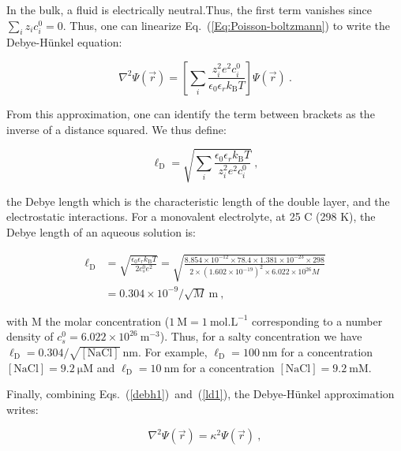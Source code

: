 In the bulk, a fluid is electrically neutral.Thus, the first term vanishes since $\sum_i z_i c_i^0 = 0$. Thus, one can linearize Eq.~(\ref{Eq:Poisson-boltzmann}) to write the Debye-Hünkel equation:

\begin{equation}
	\nabla^2 \Psi (\vec{r}) = \left[  \sum_i \frac{z_i ^2 e^2 c_i^0}{\epsilon_0 \epsilon_r  k_\mathrm{B} T}    \right] \Psi (\vec{r}) ~.
	\label{debh1}
\end{equation}

From this approximation, one can identify the term between brackets as the inverse of a distance squared. We thus define:

\begin{equation}
	\ell _\mathrm{D} =  \sqrt{ \sum_i\frac {\epsilon_0 \epsilon_r k_\mathrm{B} T} {z_i ^2 e^2 c_i^0}} ~,
	\label{ld1}
\end{equation}

the Debye length which is the characteristic length of the double layer, and the electrostatic interactions. For a monovalent electrolyte,  at 25 \textdegree C (298 K), the Debye length of an aqueous solution is:

\begin{equation}
	\begin{aligned}
		\ell _\mathrm{D} &= \sqrt{\frac{\epsilon_0 \epsilon_r k_\mathrm{B}T}{2c_s^0 e^2}}
		= \sqrt{\frac{8.854 \times 10^{-12} \times 78.4 \times 1.381 \times 10^{-23}  \times 298}{2 \times (1.602 \times 10^{-19})^2 \times 6.022 \times 10^{26} M}} \\
		& = 0.304 \times 10^{-9} / \sqrt{M} ~ \mathrm{m} ~,
	\end{aligned}
\end{equation}


with M the molar concentration ($1 ~ \mathrm{M} = 1 ~ \mathrm{mol.L^{-1}} $ corresponding to a number density of $c_s^0 = 6.022 \times 10 ^{26} ~ \mathrm{ m^{-3}}$). Thus, for a salty concentration we have
$\ell_\mathrm{D} = 0.304/ \sqrt{[\mathrm{NaCl}]} ~ \mathrm{nm}$. For example, $\ell_\mathrm{D} = 100 ~ \mathrm{nm}$ for a concentration  $[\mathrm{NaCl}] = 9.2 ~ \mathrm{\mu M}$ and   $\ell_\mathrm{D} = 10 ~  \mathrm{nm}$ for a concentration  $[\mathrm{NaCl}] = 9.2 ~ \mathrm{mM}$.



Finally, combining Eqs.~(\ref{debh1})~and~(\ref{ld1}),  the Debye-Hünkel approximation writes:

\begin{equation}
	\nabla^2 \Psi (\vec{r}) = \kappa^2  \Psi (\vec{r}) ~,
	\label{Eq:Debye_hu}
\end{equation}

